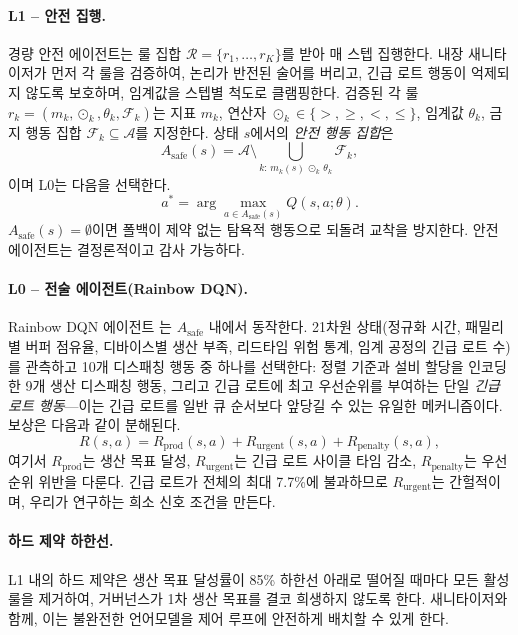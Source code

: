 \documentclass[letterpaper]{article} %
\begin{document}
\paragraph{L1 -- 안전 집행.}
경량 안전 에이전트는 룰 집합 $\mathcal{R}=\{r_1,\dots,r_K\}$를 받아 매 스텝
집행한다. 내장 새니타이저가 먼저 각 룰을 검증하여, 논리가 반전된 술어를 버리고,
긴급 로트 행동이 억제되지 않도록 보호하며, 임계값을 스텝별 척도로 클램핑한다.
검증된 각 룰 $r_k=(m_k,\odot_k,\theta_k,\mathcal{F}_k)$는 지표 $m_k$, 연산자
$\odot_k\in\{>,\geq,<,\leq\}$, 임계값 $\theta_k$, 금지 행동 집합
$\mathcal{F}_k\subseteq\mathcal{A}$를 지정한다. 상태 $s$에서의 \emph{안전 행동
집합}은
\begin{equation}
  A_{\text{safe}}(s)=\mathcal{A}\setminus
  \bigcup_{k:\,m_k(s)\,\odot_k\,\theta_k}\mathcal{F}_k,
  \label{eq:mask}
\end{equation}
이며 L0는 다음을 선택한다.
\begin{equation}
  a^{*}=\arg\max_{a\in A_{\text{safe}}(s)} Q(s,a;\theta).
  \label{eq:constrained}
\end{equation}
$A_{\text{safe}}(s)=\emptyset$이면 폴백이 제약 없는 탐욕적 행동으로 되돌려 교착을
방지한다. 안전 에이전트는 결정론적이고 감사 가능하다.

\paragraph{L0 -- 전술 에이전트(Rainbow DQN).}
Rainbow DQN 에이전트 \citep{hessel2018}는 $A_{\text{safe}}$ 내에서 동작한다.
21차원 상태(정규화 시간, 패밀리별 버퍼 점유율, 디바이스별 생산 부족, 리드타임 위험
통계, 임계 공정의 긴급 로트 수)를 관측하고 10개 디스패칭 행동 중 하나를 선택한다:
정렬 기준과 설비 할당을 인코딩한 9개 생산 디스패칭 행동, 그리고 긴급 로트에 최고
우선순위를 부여하는 단일 \emph{긴급 로트 행동}---이는 긴급 로트를 일반 큐 순서보다
앞당길 수 있는 유일한 메커니즘이다. 보상은 다음과 같이 분해된다.
\begin{equation}
  R(s,a)=R_{\text{prod}}(s,a)+R_{\text{urgent}}(s,a)+R_{\text{penalty}}(s,a),
  \label{eq:reward}
\end{equation}
여기서 $R_{\text{prod}}$는 생산 목표 달성, $R_{\text{urgent}}$는 긴급 로트 사이클
타임 감소, $R_{\text{penalty}}$는 우선순위 위반을 다룬다. 긴급 로트가 전체의 최대
7.7\%에 불과하므로 $R_{\text{urgent}}$는 간헐적이며, 우리가 연구하는 희소 신호
조건을 만든다.

\paragraph{하드 제약 하한선.}
L1 내의 하드 제약은 생산 목표 달성률이 85\% 하한선 아래로 떨어질 때마다 모든 활성
룰을 제거하여, 거버넌스가 1차 생산 목표를 결코 희생하지 않도록 한다. 새니타이저와
함께, 이는 불완전한 언어모델을 제어 루프에 안전하게 배치할 수 있게 한다.
\end{document}
